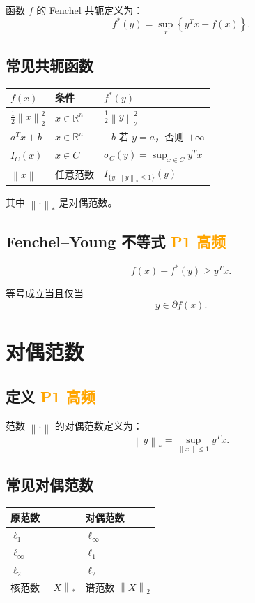 \documentclass[11pt,a4paper]{ctexart}
\newcommand{\R}{\mathbb{R}}
\newcommand{\norm}[1]{\left\lVert #1 \right\rVert}
\newcommand{\Pone}{\textcolor{orange}{\textbf{P1 高频}}}
\theoremstyle{definition}
\theoremstyle{plain}
\theoremstyle{remark}
\begin{document}
函数 $f$ 的 Fenchel 共轭定义为：
\[
    f^\ast(y)
    =
    \sup_x \left\{y^T x - f(x)\right\}.
\]

\subsection{常见共轭函数}

\begin{center}
\begin{tabular}{lll}
\toprule
$f(x)$ & 条件 & $f^\ast(y)$ \\
\midrule
$\frac12\norm{x}_2^2$ & $x\in\R^n$ & $\frac12\norm{y}_2^2$ \\
$a^T x+b$ & $x\in\R^n$ & $-b$ 若 $y=a$，否则 $+\infty$ \\
$I_C(x)$ & $x\in C$ & $\sigma_C(y)=\sup_{x\in C}y^Tx$ \\
$\norm{x}$ & 任意范数 & $I_{\{y:\norm{y}_\ast\le1\}}(y)$ \\
\bottomrule
\end{tabular}
\end{center}

其中 $\norm{\cdot}_\ast$ 是对偶范数。

\subsection{Fenchel--Young 不等式 \Pone}

\[
    f(x)+f^\ast(y)\ge y^T x.
\]

等号成立当且仅当
\[
    y\in\partial f(x).
\]

\section{对偶范数}

\subsection{定义 \Pone}

范数 $\norm{\cdot}$ 的对偶范数定义为：
\[
    \norm{y}_\ast
    =
    \sup_{\norm{x}\le1} y^T x.
\]

\subsection{常见对偶范数}

\begin{center}
\begin{tabular}{ll}
\toprule
原范数 & 对偶范数 \\
\midrule
$\ell_1$ & $\ell_\infty$ \\
$\ell_\infty$ & $\ell_1$ \\
$\ell_2$ & $\ell_2$ \\
核范数 $\norm{X}_\ast$ & 谱范数 $\norm{X}_2$ \\
\bottomrule
\end{tabular}
\end{center}
\end{document}
